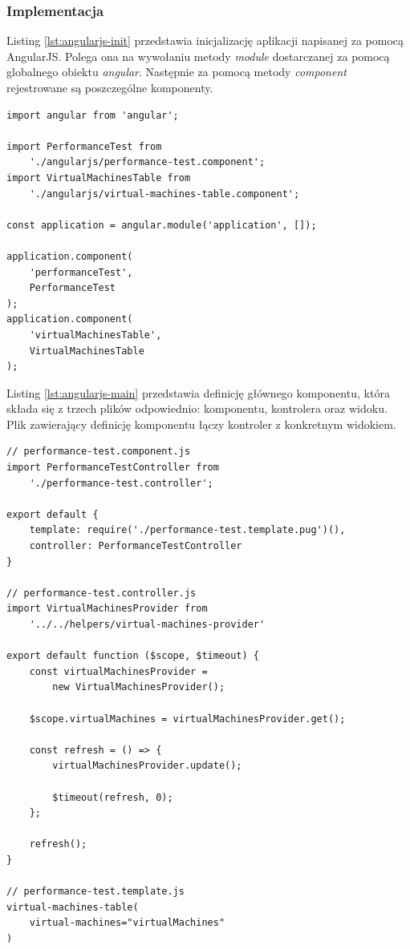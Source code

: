 \documentclass[polish, twoside, 12pt]{mwart}
\begin{document}
\subsubsection{Implementacja}

Listing \ref{lst:angularjs-init} przedstawia inicjalizację aplikacji napisanej za pomocą AngularJS. Polega ona na wywołaniu metody \emph{module} dostarczanej za pomocą globalnego obiektu \emph{angular}. Następnie za pomocą metody \emph{component} rejestrowane są poszczególne komponenty.

\begin{lstlisting}[caption=Inicjalizacja głównego modułu oraz rejestracja komponentów, label={lst:angularjs-init}]
import angular from 'angular';

import PerformanceTest from
    './angularjs/performance-test.component';
import VirtualMachinesTable from
    './angularjs/virtual-machines-table.component';

const application = angular.module('application', []);

application.component(
    'performanceTest',
    PerformanceTest
);
application.component(
    'virtualMachinesTable',
    VirtualMachinesTable
);
\end{lstlisting}

Listing \ref{lst:angularjs-main} przedstawia definicję głównego komponentu, która składa się z trzech plików odpowiednio: komponentu, kontrolera oraz widoku. Plik zawierający definicję komponentu łączy kontroler z konkretnym widokiem.

\begin{lstlisting}[caption=Główny komponent, label={lst:angularjs-main}]
// performance-test.component.js
import PerformanceTestController from
    './performance-test.controller';

export default {
    template: require('./performance-test.template.pug')(),
    controller: PerformanceTestController
}

// performance-test.controller.js
import VirtualMachinesProvider from
    '../../helpers/virtual-machines-provider'

export default function ($scope, $timeout) {
    const virtualMachinesProvider =
        new VirtualMachinesProvider();
    
    $scope.virtualMachines = virtualMachinesProvider.get();
    
    const refresh = () => {
        virtualMachinesProvider.update();

        $timeout(refresh, 0);
    };

    refresh();
}

// performance-test.template.js
virtual-machines-table(
    virtual-machines="virtualMachines"
)
\end{lstlisting}
\end{document}
